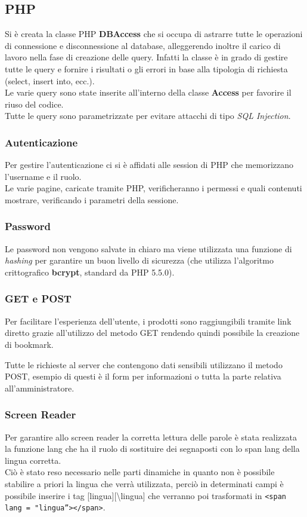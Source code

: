 \documentclass[a4paper, 11pt]{article}
\begin{document}
\subsection{PHP}
Si è creata la classe PHP \textbf{DBAccess} che si occupa di astrarre tutte le operazioni di connessione e disconnessione al database, alleggerendo inoltre il carico di lavoro nella fase di creazione delle query.
Infatti la classe è in grado di gestire tutte le query e fornire i risultati o gli errori in base alla tipologia di richiesta (select, insert into, ecc.). \\
Le varie query sono state inserite all’interno della classe \textbf{Access} per favorire il riuso del codice.  \\
Tutte le query sono parametrizzate per evitare attacchi di tipo \textit{SQL Injection}.

\subsubsection{Autenticazione}
Per gestire l’autenticazione ci si è affidati alle session di PHP che memorizzano l’username e il ruolo. \\
Le varie pagine, caricate tramite PHP, verificheranno i permessi e quali contenuti mostrare, verificando i parametri della sessione. 

\subsubsection{Password}
Le password non vengono salvate in chiaro ma viene utilizzata una funzione di \textit{hashing} per garantire un buon livello di sicurezza (che utilizza l’algoritmo crittografico \textbf{bcrypt}, standard da PHP 5.5.0).

\subsubsection{GET e POST}
Per facilitare l’esperienza dell’utente, i prodotti sono raggiungibili tramite link diretto grazie all’utilizzo del metodo GET rendendo quindi possibile la creazione di bookmark. 

Tutte le richieste al server che contengono dati sensibili utilizzano il metodo POST, esempio di questi è il form per informazioni o tutta la parte relativa all’amministratore.

\subsubsection{Screen Reader}
Per garantire allo screen reader la corretta lettura delle parole è stata realizzata la funzione lang che ha il ruolo di sostituire dei segnaposti con lo span lang della lingua corretta. \\
Ciò è stato reso necessario nelle parti dinamiche in quanto non è possibile stabilire a priori la lingua che verrà utilizzata, perciò in determinati campi è possibile inserire i tag [lingua][\textbackslash lingua] che verranno poi trasformati in \texttt{<span lang =  "lingua”></span>}.
\end{document}
